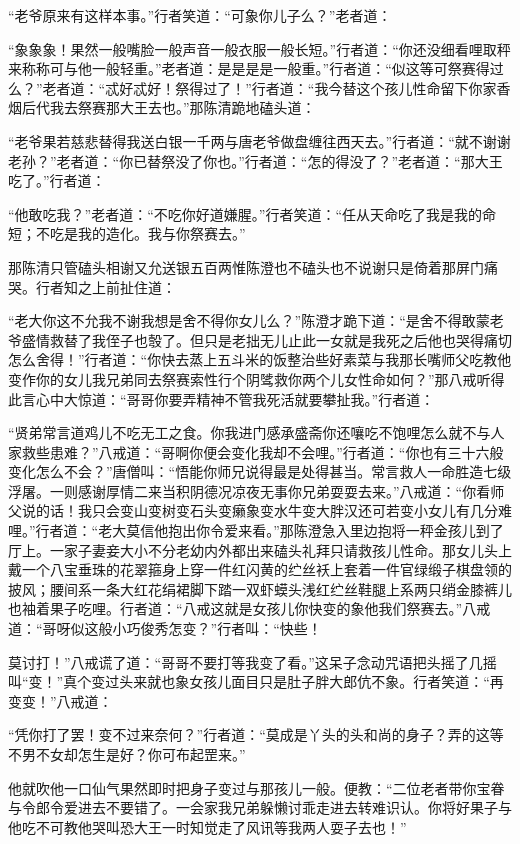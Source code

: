 \documentclass[12pt,UTF8]{ctexbook}
\begin{document}
“老爷原来有这样本事。”行者笑道：“可象你儿子么？”老者道：

“象象象！果然一般嘴脸一般声音一般衣服一般长短。”行者道：“你还没细看哩取秤来称称可与他一般轻重。”老者道：是是是是一般重。”行者道：“似这等可祭赛得过么？”老者道：“忒好忒好！祭得过了！”行者道：“我今替这个孩儿性命留下你家香烟后代我去祭赛那大王去也。”那陈清跪地磕头道：

“老爷果若慈悲替得我送白银一千两与唐老爷做盘缠往西天去。”行者道：“就不谢谢老孙？”老者道：“你已替祭没了你也。”行者道：“怎的得没了？”老者道：“那大王吃了。”行者道：

“他敢吃我？”老者道：“不吃你好道嫌腥。”行者笑道：“任从天命吃了我是我的命短；不吃是我的造化。我与你祭赛去。”

那陈清只管磕头相谢又允送银五百两惟陈澄也不磕头也不说谢只是倚着那屏门痛哭。行者知之上前扯住道：

“老大你这不允我不谢我想是舍不得你女儿么？”陈澄才跪下道：“是舍不得敢蒙老爷盛情救替了我侄子也彀了。但只是老拙无儿止此一女就是我死之后他也哭得痛切怎么舍得！”行者道：“你快去蒸上五斗米的饭整治些好素菜与我那长嘴师父吃教他变作你的女儿我兄弟同去祭赛索性行个阴骘救你两个儿女性命如何？”那八戒听得此言心中大惊道：“哥哥你要弄精神不管我死活就要攀扯我。”行者道：

“贤弟常言道鸡儿不吃无工之食。你我进门感承盛斋你还嚷吃不饱哩怎么就不与人家救些患难？”八戒道：“哥啊你便会变化我却不会哩。”行者道：“你也有三十六般变化怎么不会？”唐僧叫：“悟能你师兄说得最是处得甚当。常言救人一命胜造七级浮屠。一则感谢厚情二来当积阴德况凉夜无事你兄弟耍耍去来。”八戒道：“你看师父说的话！我只会变山变树变石头变癞象变水牛变大胖汉还可若变小女儿有几分难哩。”行者道：“老大莫信他抱出你令爱来看。”那陈澄急入里边抱将一秤金孩儿到了厅上。一家子妻妾大小不分老幼内外都出来磕头礼拜只请救孩儿性命。那女儿头上戴一个八宝垂珠的花翠箍身上穿一件红闪黄的纻丝袄上套着一件官绿缎子棋盘领的披风；腰间系一条大红花绢裙脚下踏一双虾蟆头浅红纻丝鞋腿上系两只绡金膝裤儿也袖着果子吃哩。行者道：“八戒这就是女孩儿你快变的象他我们祭赛去。”八戒道：“哥呀似这般小巧俊秀怎变？”行者叫：“快些！

莫讨打！”八戒谎了道：“哥哥不要打等我变了看。”这呆子念动咒语把头摇了几摇叫“变！”真个变过头来就也象女孩儿面目只是肚子胖大郎伉不象。行者笑道：“再变变！”八戒道：

“凭你打了罢！变不过来奈何？”行者道：“莫成是丫头的头和尚的身子？弄的这等不男不女却怎生是好？你可布起罡来。”

他就吹他一口仙气果然即时把身子变过与那孩儿一般。便教：“二位老者带你宝眷与令郎令爱进去不要错了。一会家我兄弟躲懒讨乖走进去转难识认。你将好果子与他吃不可教他哭叫恐大王一时知觉走了风讯等我两人耍子去也！”
\end{document}
